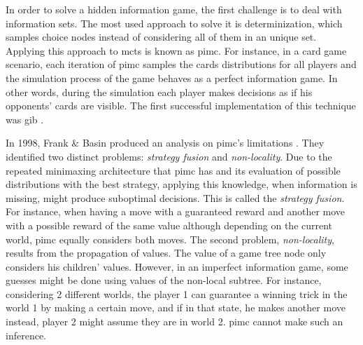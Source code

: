 In order to solve a hidden information game, the first challenge is to deal with information sets.
The most used approach to solve it is determinization, which samples choice nodes instead of considering all of them in an unique set.
Applying this approach to \gls{mcts} is known as \gls{pimc}.
For instance, in a card game scenario, each iteration of \gls{pimc} samples the cards distributions for all players and the simulation process of the game behaves as a perfect information game.
In other words, during the simulation each player makes decisions as if his opponents' cards are visible.
The first successful implementation of this technique was \gls{gib} \cite{Ginsberg2001}.


In 1998, Frank \& Basin produced an analysis on \gls{pimc}'s limitations \cite{Frank1998}.
They identified two distinct problems: \emph{strategy fusion} and \emph{non-locality}.
Due to the repeated minimaxing architecture that \gls{pimc} has and its evaluation of possible distributions with the best strategy, applying this knowledge, when information is missing, might produce suboptimal decisions.
This is called the \emph{strategy fusion}.
For instance, when having a move with a guaranteed reward and another move with a possible reward of the same value although depending on the current world, \gls{pimc} equally considers both moves.
The second problem, \emph{non-locality}, results from the propagation of values.
The value of a game tree node only considers his children' values.
However, in an imperfect information game, some guesses might be done using values of the non-local subtree.
For instance, considering 2 different worlds, the player 1 can guarantee a winning trick in the world 1 by making a certain move, and if in that state, he makes another move instead, player 2 might assume they are in world 2.
\gls{pimc} cannot make such an inference.


